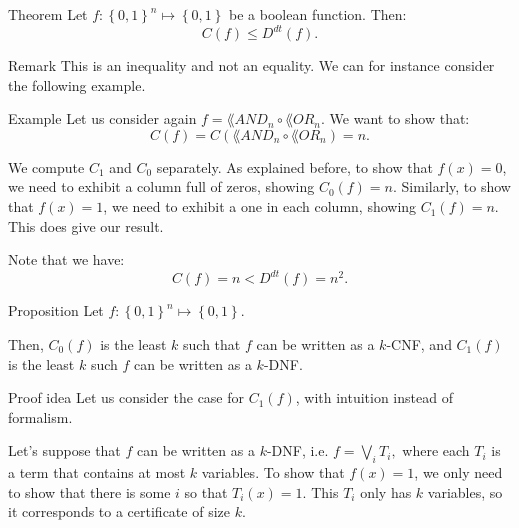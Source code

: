 \documentclass[a4paper]{article}
\begin{document}
\begin{parag}{Theorem}
    Let $f: \left\{0, 1\right\}^n \mapsto \left\{0, 1\right\}$ be a boolean function. Then: 
    \[C\left(f\right) \leq D^{dt}\left(f\right).\]
    
    \begin{subparag}{Remark}
        This is an inequality and not an equality. We can for instance consider the following example.
    \end{subparag}
\end{parag}

\begin{parag}{Example}
    Let us consider again $f = \lang{AND}_n \circ \lang{OR}_n$. We want to show that:
    \[C\left(f\right) = C\left(\lang{AND}_n \circ \lang{OR}_n\right) = n.\]

    We compute $C_1$ and $C_0$ separately. As explained before, to show that $f\left(x\right) = 0$, we need to exhibit a column full of zeros, showing $C_0\left(f\right) = n$. Similarly, to show that $f\left(x\right) = 1$, we need to exhibit a one in each column, showing $C_1\left(f\right) = n$. This does give our result.

    Note that we have: 
    \[C\left(f\right) = n < D^{dt}\left(f\right) = n^2.\]
\end{parag}

\begin{parag}{Proposition}
    Let $f: \left\{0, 1\right\}^n \mapsto \left\{0, 1\right\}$.

    Then, $C_0\left(f\right)$ is the least $k$ such that $f$ can be written as a $k$-CNF, and $C_1\left(f\right)$ is the least $k$ such $f$ can be written as a $k$-DNF.

    \begin{subparag}{Proof idea}
        Let us consider the case for $C_1\left(f\right)$, with intuition instead of formalism.

        Let's suppose that $f$ can be written as a $k$-DNF, i.e. $f = \bigvee_i T_i,$ where each $T_i$ is a term that contains at most $k$ variables. To show that $f\left(x\right) = 1$, we only need to show that there is some $i$ so that $T_i\left(x\right) = 1$. This $T_i$ only has $k$ variables, so it corresponds to a certificate of size $k$.
    \end{subparag}
\end{parag}
\end{document}
